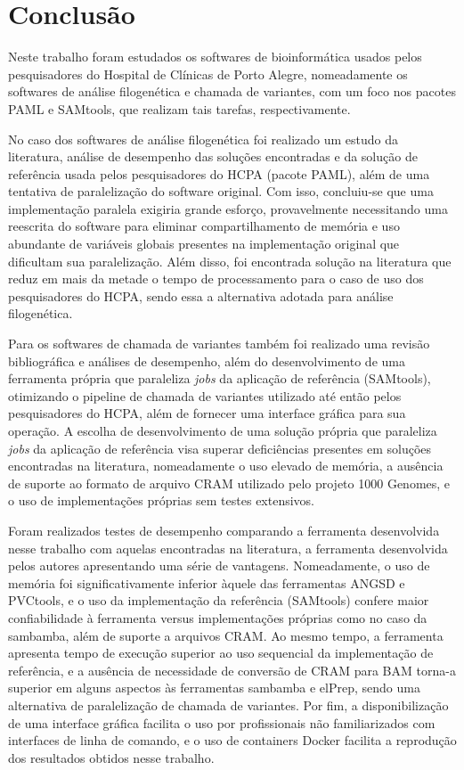 \documentclass[cic,tc]{iiufrgs}
\begin{document}
\chapter{Conclusão}

Neste trabalho foram estudados os softwares de bioinformática usados pelos
pesquisadores do Hospital de Clínicas de Porto Alegre, nomeadamente os
softwares de análise filogenética e chamada de variantes, com um foco nos
pacotes PAML e SAMtools, que realizam tais tarefas, respectivamente.

No caso dos softwares de análise filogenética foi realizado um estudo da
literatura, análise de desempenho das soluções encontradas e da solução de
referência usada pelos pesquisadores do HCPA (pacote PAML), além de uma
tentativa de paralelização do software original. Com isso, concluiu-se que uma
implementação paralela exigiria grande esforço, provavelmente necessitando uma
reescrita do software para eliminar compartilhamento de memória e uso
abundante de variáveis globais presentes na implementação original que
dificultam sua paralelização. Além disso, foi encontrada solução na literatura
que reduz em mais da metade o tempo de processamento para o caso de uso dos
pesquisadores do HCPA, sendo essa a alternativa adotada para análise
filogenética.

Para os softwares de chamada de variantes também foi realizado uma revisão
bibliográfica e análises de desempenho, além do desenvolvimento de uma
ferramenta própria que paraleliza \textit{jobs} da aplicação de referência
(SAMtools), otimizando o pipeline de chamada de variantes utilizado até então
pelos pesquisadores do HCPA, além de fornecer uma interface gráfica para sua
operação. A escolha de desenvolvimento de uma solução própria que paraleliza
\textit{jobs} da aplicação de referência visa superar deficiências presentes em
soluções encontradas na literatura, nomeadamente o uso elevado de memória, a
ausência de suporte ao formato de arquivo CRAM utilizado pelo projeto 1000
Genomes, e o uso de implementações próprias sem testes extensivos.

Foram realizados testes de desempenho comparando a ferramenta desenvolvida
nesse trabalho com aquelas encontradas na literatura, a ferramenta desenvolvida
pelos autores apresentando uma série de vantagens. Nomeadamente, o uso de
memória foi significativamente inferior àquele das ferramentas ANGSD e
PVCtools, e o uso da implementação da referência (SAMtools) confere maior
confiabilidade à ferramenta versus implementações próprias como no caso da
sambamba, além de suporte a arquivos CRAM. Ao mesmo tempo, a ferramenta
apresenta tempo de execução superior ao uso sequencial da implementação de
referência, e a ausência de necessidade de conversão de CRAM para BAM torna-a
superior em alguns aspectos às ferramentas sambamba e elPrep, sendo uma
alternativa de paralelização de chamada de variantes. Por fim, a
disponibilização de uma interface gráfica facilita o uso por profissionais não
familiarizados com interfaces de linha de comando, e o uso de containers Docker
facilita a reprodução dos resultados obtidos nesse trabalho.
\end{document}
